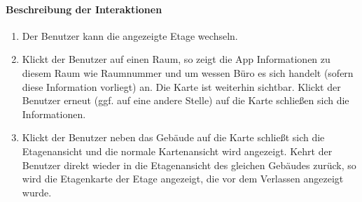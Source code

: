\paragraph{Beschreibung der Interaktionen}
\begin{enumerate}
    \item Der Benutzer kann die angezeigte Etage wechseln.
    \item Klickt der Benutzer auf einen Raum, so zeigt die App Informationen zu diesem Raum wie Raumnummer und um wessen Büro es sich handelt (sofern diese Information vorliegt) an. Die Karte ist weiterhin sichtbar. Klickt der Benutzer erneut (ggf. auf eine andere Stelle) auf die Karte schließen sich die Informationen.
    \item Klickt der Benutzer neben das Gebäude auf die Karte schließt sich die Etagenansicht und die normale Kartenansicht wird angezeigt. Kehrt der Benutzer direkt wieder in die Etagenansicht des gleichen Gebäudes zurück, so wird die Etagenkarte der Etage angezeigt, die vor dem Verlassen angezeigt wurde.
\end{enumerate}